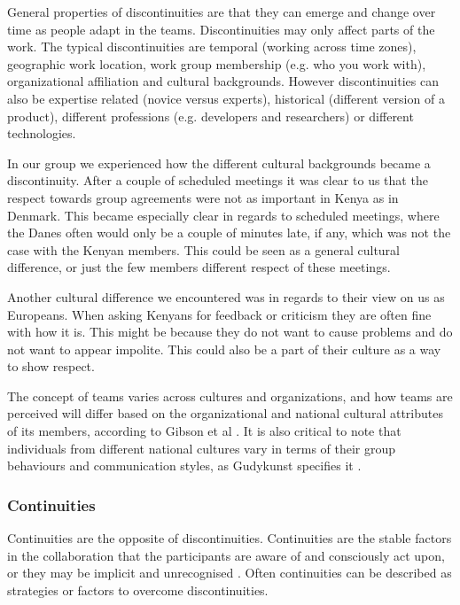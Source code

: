 General properties of discontinuities are that they can emerge and change over time as people adapt in the teams. Discontinuities may only affect parts of the work. The typical discontinuities are temporal (working across time zones), geographic work location, work group membership (e.g. who you work with), organizational affiliation and cultural backgrounds. However discontinuities can also be expertise related (novice versus experts), historical (different version of a product), different professions (e.g. developers and researchers) or different technologies.


In our group we experienced how the different cultural backgrounds became a discontinuity. After a couple of scheduled meetings it was clear to us that the respect towards group agreements were not as important in Kenya as in Denmark. This became especially clear in regards to scheduled meetings, where the Danes often would only be a couple of minutes late, if any, which was not the case with the Kenyan members. This could be seen as a general cultural difference, or just the few members different respect of these meetings. 

Another cultural difference we encountered was in regards to their view on us as Europeans. When asking Kenyans for feedback or criticism they are often fine with how it is. This might be because they do not want to cause problems and do not want to appear impolite. This could also be a part of their culture as a way to show respect.

The concept of teams varies across cultures and organizations, and how teams are perceived will differ based on the organizational and national cultural attributes of its members, according to Gibson et al \cite{gibson2001metaphors}. It is also critical to note that individuals from different national cultures vary in terms of their group behaviours and communication styles, as Gudykunst specifies it \cite{gudykunst1997cultural}.

\subsubsection{Continuities} \label{subsubsec:continuities}
Continuities are the opposite of discontinuities. Continuities are the stable factors in the collaboration that the participants are aware of and consciously act upon, or they may be implicit and unrecognised \cite{watson2007distance}. Often continuities can be described as strategies or factors to overcome discontinuities.
